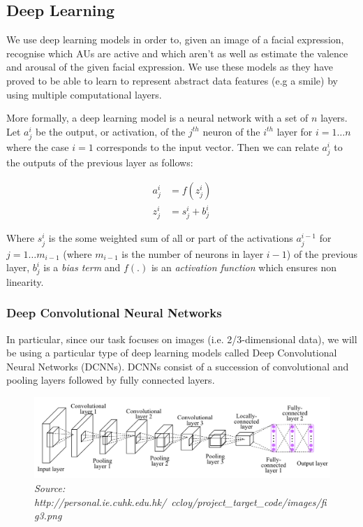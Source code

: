 \documentclass[12pt,twoside]{article}
\newcommand{\source}[1]{\vspace{-3pt} \caption*{ \footnotesize{\textit{Source: {#1}}}} }
\begin{document}
\subsection{Deep Learning}

We use deep learning models in order to, given an image of a facial expression,
recognise which AUs are active and which aren't as well as estimate the valence and
arousal of the given facial expression. We use these models as they have proved
to be able to learn to represent abstract data features (e.g a smile) by using
multiple computational layers.

More formally, a deep learning model is a neural network with a set of
$n$ layers. Let $a_j^i$ be the output, or activation, of the $j^{th}$ neuron of
the $i^{th}$ layer for $i = 1 \dots n$ where the case $i=1$ corresponds to the
input vector. Then we can relate $a_j^i$ to the outputs of the previous layer
as follows:

\begin{align}
  a_j^i &= f\left( z_j^i  \right)\\
  z_j^i &= s_j^i + b_j^i 
  \label{eq:NN}
\end{align}

Where $s_j^i$ is the some weighted sum of all or part of the activations
$a_j^{i-1}$ for $j = 1 \dots m_{i-1}$ (where $m_{i-1}$ is the number of
neurons in layer $i-1$) of the previous layer, $b_j^i$ is a \textit{bias term} and
$f(.)$ is an \textit{activation function} which ensures non linearity.

\subsubsection{Deep Convolutional Neural Networks}

In particular, since our task focuses on images (i.e. 2/3-dimensional data), we
will be using a particular type of deep learning models called Deep
Convolutional Neural Networks (DCNNs). DCNNs consist of a succession of 
convolutional and pooling layers followed by fully connected layers.

\begin{figure}[ht]
  \centering
  \includegraphics[scale=0.8]{figures/cnn.png}
  \caption{example of a DCNN architecture with a succession of convolutional +
  max pooling layers followed by a bloc of fully connected layers}
  \source{http://personal.ie.cuhk.edu.hk/~ccloy/project\_target\_code/images/fig3.png}
  \label{fig:cnn}
\end{figure}
\end{document}
